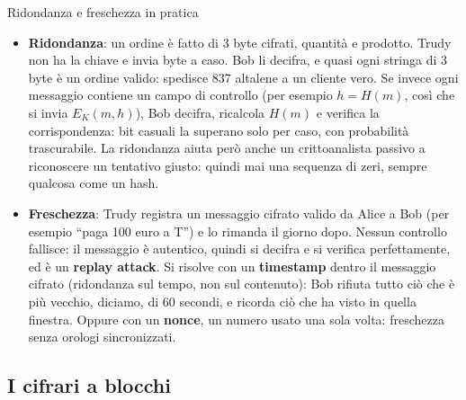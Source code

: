 \begin{esempio}{Ridondanza e freschezza in pratica}
\begin{itemize}
    \item \textbf{Ridondanza}: un ordine è fatto di 3 byte cifrati, quantità e prodotto. Trudy non ha la chiave e invia byte a caso. Bob li
          decifra, e quasi ogni stringa di 3 byte è un ordine valido: spedisce 837 altalene a un cliente vero. Se invece ogni messaggio
          contiene un campo di controllo (per esempio $h = H(m)$, così che si invia $E_K(m, h)$), Bob decifra, ricalcola $H(m)$ e verifica
          la corrispondenza: bit casuali la superano solo per caso, con probabilità trascurabile. La ridondanza aiuta però anche un
          crittoanalista passivo a riconoscere un tentativo giusto: quindi mai una sequenza di zeri, sempre qualcosa come un hash.
    \item \textbf{Freschezza}: Trudy registra un messaggio cifrato valido da Alice a Bob (per esempio ``paga 100 euro a T'') e lo rimanda
          il giorno dopo. Nessun controllo fallisce: il messaggio è autentico, quindi si decifra e si verifica perfettamente, ed è un
          \textbf{replay attack}. Si risolve con un \textbf{timestamp} dentro il messaggio cifrato (ridondanza sul tempo, non sul
          contenuto): Bob rifiuta tutto ciò che è più vecchio, diciamo, di 60 secondi, e ricorda ciò che ha visto in quella finestra.
          Oppure con un \textbf{nonce}, un numero usato una sola volta: freschezza senza orologi sincronizzati.
\end{itemize}
\end{esempio}

\subsection{I cifrari a blocchi}

